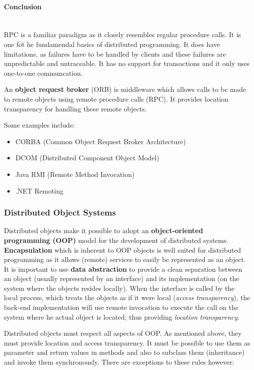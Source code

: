 \documentclass[a4paper]{article}
\newcommand{\subsubsubsection}[1]{\paragraph{#1}\mbox{}\\}
\begin{document}
\subsubsubsection{Conclusion}

RPC is a familiar paradigm as it closely resembles regular procedure calls. It is one fot he fundamendal basics of distributed programming. It does have limitations, as failures have to be handled by clients and these failures are unpredictable and untraceable. It has no support for transactions and it only uses one-to-one communcation.

An \textbf{object request broker} (ORB) is middleware which allows calls to be made to remote objects using remote procedure calls (RPC). It provides location transparency for handling these remote objects.

Some examples include:
\begin{itemize}
\item CORBA (Common Object Request Broker Architecture)
\item DCOM (Distributed Component Object Model)
\item Java RMI (Remote Method Invocation)
\item .NET Remoting
\end{itemize}

\subsubsection{Distributed Object Systems}

Distributed objects make it possible to adopt an \textbf{object-oriented programming (OOP)} model for the development of distributed systems. \textbf{Encapsulation} which is inherent to OOP objects is well suited for distributed programming as it allows (remote) services to easily be represented as an object. It is important to use \textbf{data abstraction} to provide a clean separation between an object (usually represented by an interface) and its implementation (on the system where the objects resides locally). When the interface is called by the local process, which treats the objects as if it were local (\textit{access transparency}), the back-end implementation will use remote invocation to execute the call on the system where he actual object is located; thus providing \textit{location transparency}.

Distributed objects must respect all aspects of OOP. As mentioned above, they must provide location and access transparency. It must be possible to use them as parameter and return values in methods and also to subclass them (inheritance) and invoke them synchronously. There are exceptions to these rules however:
\end{document}
